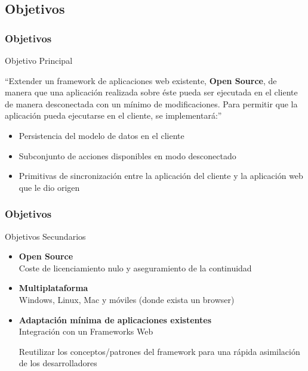 \documentclass{beamer}
\begin{document}
\subsection{Objetivos}
\begin{frame}
    \frametitle{Objetivos}
    \begin{block}{Objetivo Principal}
    
    ``Extender un framework de aplicaciones web existente, {\bf Open Source},
              de manera que una aplicación realizada sobre éste pueda ser ejecutada
              en el cliente de manera desconectada con un mínimo de modificaciones.
              Para permitir que la aplicación pueda ejecutarse en el cliente, se
              implementará:''
        \begin{itemize}
        \item Persistencia del modelo de datos en el cliente
        \item Subconjunto de acciones disponibles en modo desconectado
        \item Primitivas de sincronización entre la aplicación del cliente y la aplicación web que le dio origen
        \end{itemize}
    \end{block}
\end{frame}


\begin{frame}
    \frametitle{Objetivos}
    \begin{block}{Objetivos Secundarios}
    \begin{itemize}
        \item{{\bf Open Source}\\
                Coste de licenciamiento nulo y aseguramiento de la continuidad
        }
        \item{{\bf Multiplataforma}\\
            Windows, Linux, Mac y móviles (donde exista un browser)
        }
        \item{{\bf Adaptación mínima de aplicaciones existentes}\\
            Integración con un Frameworks Web \par
            Reutilizar los conceptos/patrones del framework para una rápida asimilación de los desarrolladores
        }
    \end{itemize}
    \end{block}
\end{frame}
\end{document}
